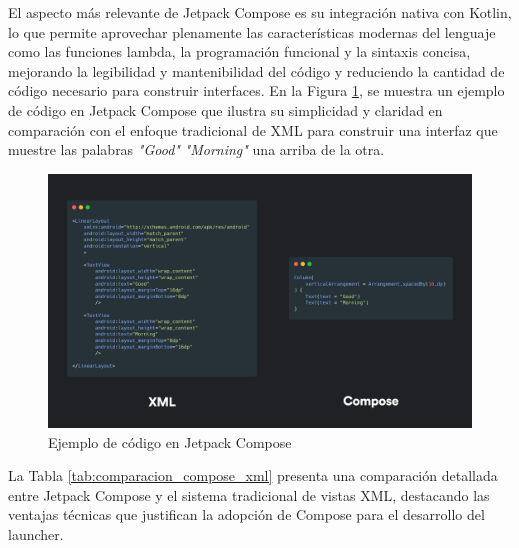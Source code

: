 El aspecto más relevante de Jetpack Compose es su integración nativa con Kotlin, lo que permite aprovechar plenamente las características modernas del lenguaje como las funciones lambda, la programación funcional y la sintaxis concisa, mejorando la legibilidad y mantenibilidad del código y reduciendo la cantidad de código necesario para construir interfaces. En la Figura \ref{fig:compose_vs_xml}, se muestra un ejemplo de código en Jetpack Compose que ilustra su simplicidad y claridad en comparación con el enfoque tradicional de XML para construir una interfaz que muestre las palabras \textit{"Good"} \textit{"Morning"} una arriba de la otra.

\begin{figure}[ht]
\caption{Ejemplo de código en Jetpack Compose}
\label{fig:compose_vs_xml}
\includegraphics[width=\textwidth]{Figuras/compose_vs_xml.jpg}
\centering
\end{figure}

\pagebreak

La Tabla \ref{tab:comparacion_compose_xml} presenta una comparación detallada entre Jetpack Compose y el sistema tradicional de vistas XML, destacando las ventajas técnicas que justifican la adopción de Compose para el desarrollo del launcher.

